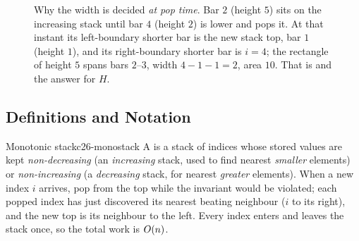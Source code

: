 \begin{figure}[H]
\centering
{}
\caption{Why the width is decided \emph{at pop time}. Bar $2$ (height $5$) sits on the increasing stack
until bar $4$ (height $2$) is lower and pops it. At that instant its left-boundary shorter bar is the
new stack top, bar $1$ (height $1$), and its right-boundary shorter bar is $i=4$; the rectangle of
height $5$ spans bars $2$--$3$, width $4-1-1=2$, area $10$. That is  and the answer for
$H$.}\label{fig:c26-histfig}
\end{figure}

\subsection{Definitions and Notation}

\begin{definition}{Monotonic stack}{c26-monostack}
A  is a stack of indices whose stored values are kept \emph{non-decreasing} (an
\emph{increasing} stack, used to find nearest \emph{smaller} elements) or \emph{non-increasing} (a
\emph{decreasing} stack, for nearest \emph{greater} elements). When a new index $i$ arrives, pop from
the top while the invariant would be violated; each popped index has just discovered its nearest
beating neighbour ($i$ to its right), and the new top is its neighbour to the left. Every index enters
and leaves the stack once, so the total work is $O(n)$.
\end{definition}

